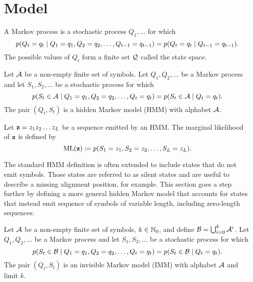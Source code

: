\section{Model}

\begin{definition}\label{def:mp}
  A Markov process is a stochastic process $Q_1, \dots$ for which
  \begin{equation*}
    p(Q_t=q_t \;|\; Q_1=q_1, Q_2=q_2, \dots, Q_{t-1}=q_{t-1}) = p(Q_t=q_t \;|\; Q_{t-1}=q_{t-1}).
  \end{equation*}
  The possible values of $Q_t$ form a finite set $\mathcal{Q}$ called the state space.
\end{definition}

\begin{definition}\label{def:hmm}
  Let $\mathcal{A}$ be a non-empty finite set of symbols. Let $Q_1, Q_2, \dots$ be a Markov process and
  let $S_1, S_2, \dots$ be a stochastic process for which
  \begin{equation*}
    p(S_t\in\mathcal{A} \;|\; Q_1=q_1, Q_2=q_2, \dots, Q_t=q_t) = p(S_t\in\mathcal{A} \;|\; Q_t=q_t).
  \end{equation*}
  The pair $(Q_t, S_t)$ is a hidden Markov model (HMM) with alphabet $\mathcal{A}$.
\end{definition}

Let $\mathbf{z}=z_1z_2 \dots z_L$ be a sequence emitted by an HMM.\@
The marginal likelihood of $\mathbf{z}$ is defined by
\begin{equation}\label{eq:hml}
  \mathrm{ML}(\mathbf{z}) \coloneqq p(S_1=z_1, S_2=z_2, \dots, S_L=z_L).
\end{equation}

The standard HMM definition is often extended to include states that do not emit symbols. Those
states are referred to as silent states and are useful to describe a missing alignment position, for
example. This section goes a step further by defining a more general hidden Markov model that
accounts for states that instead emit sequence of symbols of variable length, including zero-length
sequences.

\begin{definition}
  Let $\mathcal{A}$ be a non-empty finite set of symbols, $k\in\mathbb{N}_0$, and define
  $\mathcal{B}=\bigcup_{i=0}^k\mathcal{A}^i$.
  Let $Q_1, Q_2, \dots$ be a Markov process and let $S_1, S_2, \dots$ be a stochastic process for
  which
  \begin{equation*}
    p(S_t\in\mathcal{B} \;|\; Q_1=q_1, Q_2=q_2, \dots, Q_t=q_t)
    = p(S_t\in\mathcal{B} \;|\; Q_t=q_t).
  \end{equation*}
  The pair $(Q_t, S_t)$ is an invisible Markov model (IMM) with alphabet $\mathcal{A}$ and
  limit $k$.
\end{definition}

